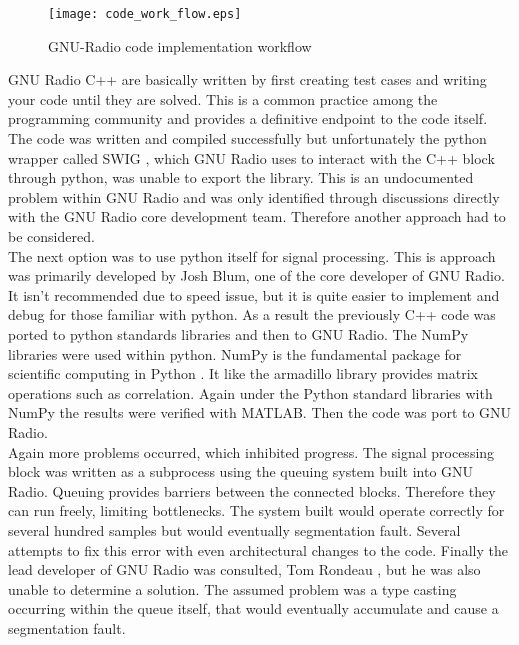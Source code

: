 \begin{figure}[!ht] 
\centering
\texttt{[image: code\_work\_flow.eps]}
\caption{GNU-Radio code implementation workflow}
\end{figure}

GNU Radio C++ are basically written by first creating test cases and writing your code until they are solved.  This is a common practice among the programming community and provides a definitive endpoint to the code itself.  The code was written and compiled successfully but unfortunately the python wrapper called SWIG \cite{swig}, which GNU Radio uses to interact with the C++ block through python, was unable to export the library.  This is an undocumented problem within GNU Radio and was only identified through discussions directly with the GNU Radio core development team.  Therefore another approach had to be considered.\\

The next option was to use python itself for signal processing.  This is approach was primarily developed by Josh Blum, one of the core developer of GNU Radio.  It isn't recommended due to speed issue, but it is quite easier to implement and debug for those familiar with python.  As a result the previously C++ code was ported to python standards libraries and then to GNU Radio.  The NumPy libraries were used within python.  NumPy is the fundamental package for scientific computing in Python \cite{numpy}.  It like the armadillo library provides matrix operations such as correlation.  Again under the Python standard libraries with NumPy the results were verified with MATLAB.  Then the code was port to GNU Radio.\\

Again more problems occurred, which inhibited progress.  The signal processing block was written as a subprocess using the queuing system built into GNU Radio.  Queuing provides barriers between the connected blocks.  Therefore they can run freely, limiting bottlenecks. The system built would operate correctly for several hundred samples but would eventually segmentation fault.  Several attempts to fix this error with even architectural changes to the code.  Finally the lead developer of GNU Radio was consulted, Tom Rondeau \cite{tomrondeau}, but he was also unable to determine a solution.  The assumed problem was a type casting occurring within the queue itself, that would eventually accumulate and cause a segmentation fault.\\

